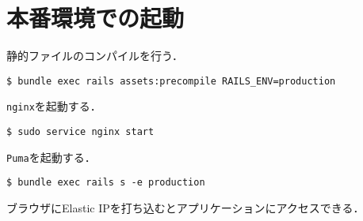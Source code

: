 \section{本番環境での起動}
静的ファイルのコンパイルを行う．
\begin{screen}
    \texttt{\$ bundle exec rails assets:precompile RAILS\_ENV=production}
\end{screen}
\texttt{nginx}を起動する．
\begin{screen}
    \texttt{\$ sudo service nginx start}
\end{screen}
\texttt{Puma}を起動する．
\begin{screen}
    \texttt{\$ bundle exec rails s -e production}
\end{screen}
ブラウザにElastic IPを打ち込むとアプリケーションにアクセスできる．